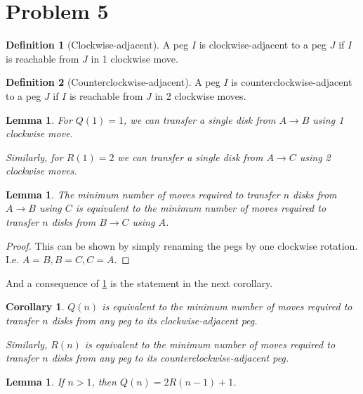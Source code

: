 \documentclass[12pt]{article}
\newtheorem{corollary}{Corollary}[theorem]
\newtheorem{lemma}[theorem]{Lemma}
\theoremstyle{definition}
\newtheorem{definition}{Definition}[section]
\begin{document}
\section{Problem 5}

\begin{definition}[Clockwise-adjacent]
  A peg $I$ is clockwise-adjacent to a peg $J$ if $I$ is reachable from
  $J$ in 1 clockwise move.
\end{definition}

\begin{definition}[Counterclockwise-adjacent]
  A peg $I$ is counterclockwise-adjacent to a peg $J$ if $I$ is reachable from
  $J$ in 2 clockwise moves.
\end{definition}

\begin{lemma}
  \label{basecases}
  For $Q(1) = 1$, we can transfer a single disk from $A \to B$ using 1
  clockwise move.

  Similarly, for $R(1) = 2$ we can transfer a single disk
  from $A \to C$ using 2 clockwise moves.
\end{lemma}

\begin{lemma}
  \label{minmoves}
  The minimum number of moves required to transfer $n$ disks from $A
  \to B$ using $C$ is equivalent to the minimum number of moves
  required to transfer $n$ disks from $B \to C$ using $A$.
\end{lemma}

\begin{proof}
  This can be shown by simply renaming the pegs by one clockwise
  rotation. I.e. $A = B, B = C, C = A$.
\end{proof}

And a consequence of \cref{minmoves} is the statement in the
next corollary.

\begin{corollary}
  \label{genfuncs}
  $Q(n)$ is equivalent to the minimum number of moves required to transfer $n$
  disks from any peg to its clockwise-adjacent peg.

  Similarly, $R(n)$ is equivalent to the minimum number of moves required to
  transfer $n$ disks from any peg to its counterclockwise-adjacent
  peg.
\end{corollary}

\begin{lemma}
  \label{q}
  If $n > 1$, then $Q(n) = 2R(n - 1) + 1$.
\end{lemma}
\end{document}
